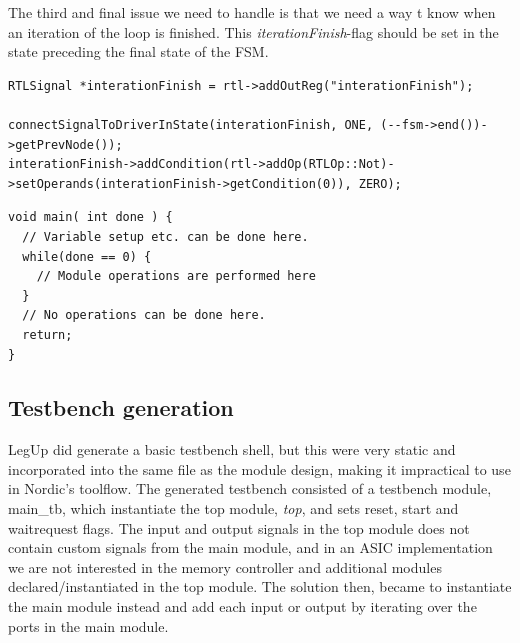 The third and final issue we need to handle is that we need a way t know when an iteration of the loop is finished. This \textit{iterationFinish}-flag should be set in the state preceding the final state of the FSM.
\lstset{language=C,style=Cstyle}
\begin{lstlisting}
RTLSignal *interationFinish = rtl->addOutReg("interationFinish");

connectSignalToDriverInState(interationFinish, ONE, (--fsm->end())->getPrevNode());
interationFinish->addCondition(rtl->addOp(RTLOp::Not)->setOperands(interationFinish->getCondition(0)), ZERO);
\end{lstlisting}
\begin{lstlisting}[caption={FIR-filter implemented in C},label=lst:firfilterc]
void main( int done ) {
  // Variable setup etc. can be done here.
  while(done == 0) {
    // Module operations are performed here
  }
  // No operations can be done here.
  return;
}
\end{lstlisting}

\subsection{\label{subsec:tbgen}Testbench generation}
LegUp did generate a basic testbench shell, but this were very static and incorporated into the same file as the module design, making it impractical to use in Nordic's toolflow. The generated testbench consisted of a testbench module, main\_tb, which instantiate the top module, \textit{top}, and sets reset, start and waitrequest flags. The input and output signals in the top module does not contain custom signals from the main module, and in an ASIC implementation we are not interested in the memory controller and additional modules declared/instantiated in the top module. The solution then, became to instantiate the main module instead and add each input or output by iterating over the ports in the main module.


